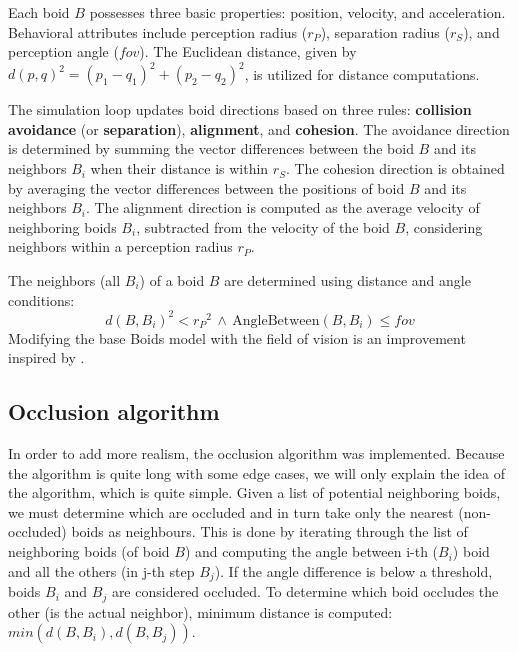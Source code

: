 \documentclass[9pt]{pnas-new}
\begin{document}
Each boid $B$ possesses three basic properties: position, velocity, and acceleration. Behavioral attributes include perception radius ($r_P$), separation radius ($r_S$), and perception angle ($fov$). The Euclidean distance, given by $d(p, q)^2 = (p_1-q_1)^2 + (p_2 - q_2)^2$, is utilized for distance computations.

The simulation loop updates boid directions based on three rules: \textbf{collision avoidance} (or \textbf{separation}), \textbf{alignment}, and \textbf{cohesion}. The avoidance direction is determined by summing the vector differences between the boid $B$ and its neighbors $B_i$ when their distance is within $r_S$. The cohesion direction is obtained by averaging the vector differences between the positions of boid $B$ and its neighbors $B_i$. The alignment direction is computed as the average velocity of neighboring boids $B_i$, subtracted from the velocity of the boid $B$, considering neighbors within a perception radius $r_P$.

The neighbors (all $B_i$) of a boid $B$ are determined using distance and angle conditions:
\begin{equation} \label{eq:neighbor_predicate}
    d(B, B_i)^2 < {r_P}^2 \, \land \, \text{AngleBetween}(B, B_i) \leq fov
\end{equation}
Modifying the base Boids model with the field of vision is an improvement inspired by \cite{JDemsar_predator_attacks}.


\subsection*{Occlusion algorithm}

In order to add more realism, the occlusion algorithm was implemented.
Because the algorithm is quite long with some edge cases, we will only explain the idea of the algorithm, which is quite simple.
Given a list of potential neighboring boids, we must determine which are occluded and in turn take only the nearest (non-occluded) boids as neighbours.
This is done by iterating through the list of neighboring boids (of boid $B$) and computing the angle between i-th ($B_i$) boid and all the others (in j-th step $B_j$).
If the angle difference is below a threshold, boids $B_i$ and $B_j$ are considered occluded.
To determine which boid occludes the other (is the actual neighbor), minimum distance is computed: $ min(d(B, B_i), d(B, B_j)) $.
\end{document}
